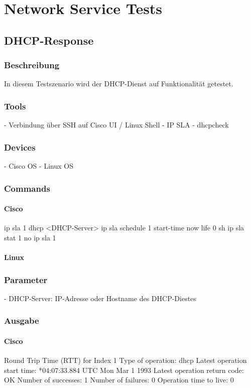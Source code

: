 \documentclass[a4,12pt]{scrartcl}
\begin{document}
\newpage
\section{Network Service Tests}
\subsection{DHCP-Response}
\subsubsection{Beschreibung}
In diesem Testszenario wird der DHCP-Dienst auf Funktionalität getestet.
\subsubsection{Tools}
- Verbindung über SSH auf Cisco UI / Linux Shell
- IP SLA
- dhcpcheck
\subsubsection{Devices}
- Cisco OS
- Linux OS
\subsubsection{Commands}
\paragraph{Cisco}
ip sla 1
dhcp <DHCP-Server>
ip sla schedule 1 start-time now life 0
sh ip sla stat 1
no ip sla 1
			
\paragraph{Linux}
\subsubsection{Parameter}
- DHCP-Server: IP-Adresse oder Hostname des DHCP-Diestes
\subsubsection{Ausgabe}
\paragraph{Cisco}
Round Trip Time (RTT) for       Index 1
Type of operation: dhcp
Latest operation start time: *04:07:33.884 UTC Mon Mar 1 1993
Latest operation return code: OK
Number of successes: 1
Number of failures: 0
Operation time to live: 0
\end{document}
